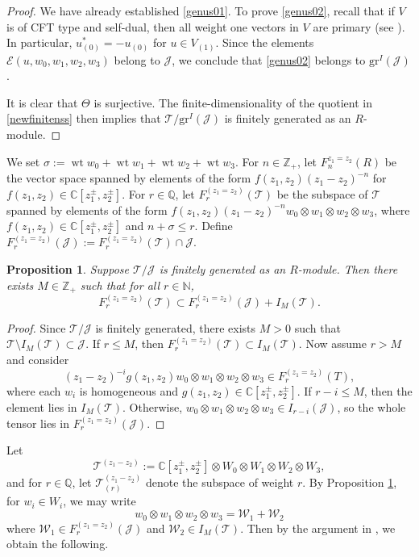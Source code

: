 \documentclass[9pt]{amsart}
\newtheorem{proposition}{Proposition}[section]
\newcommand{\T}{\mathcal{T}}
\newcommand{\J}{\mathcal{J}}
\begin{document}
\begin{proof}
We have already established \eqref{genus01}. To prove \eqref{genus02}, recall that if $V$ is of CFT type and self-dual, then all weight one vectors in $V$ are primary (see \cite{li1994symmetric}). In particular, $u_{(0)}^{*} = -u_{(0)}$ for $u \in V_{(1)}$. Since the elements $\mathcal{E}(u, w_0, w_1, w_2, w_3)$ belong to $\J$, we conclude that \eqref{genus02} belongs to $\mathrm{gr}^{I}(\mathcal{J})$.

It is clear that $\Theta$ is surjective. The finite-dimensionality of the quotient in \eqref{newfinitenss} then implies that $\T / \mathrm{gr}^I(\J)$ is finitely generated as an $R$-module.
\end{proof}

We set $\sigma := \operatorname{wt} w_0 + \operatorname{wt} w_1 + \operatorname{wt} w_2 + \operatorname{wt} w_3$. For $n \in \mathbb{Z}_{+}$, let $F_n^{z_1 = z_2}(R)$ be the vector space spanned by elements of the form $f(z_1, z_2)(z_1 - z_2)^{-n}$ for $f(z_1, z_2) \in \mathbb{C}[z_1^{\pm}, z_2^{\pm}]$. For $r \in \mathbb{Q}$, let $F_r^{(z_1 = z_2)}(\T)$ be the subspace of $\T$ spanned by elements of the form $f(z_1, z_2)(z_1 - z_2)^{-n} w_0 \otimes w_1 \otimes w_2 \otimes w_3$, where $f(z_1, z_2) \in \mathbb{C}[z_1^{\pm}, z_2^{\pm}]$ and $n + \sigma \leq r$. Define $F_r^{(z_1 = z_2)}(\J) := F_r^{(z_1 = z_2)}(\T) \cap \J$.

\begin{proposition}\label{decom}
Suppose $\T/\J$ is finitely generated as an $R$-module. Then there exists $M \in \mathbb{Z}_{+}$ such that for all $r \in \mathbb{N}$,
\[
F_r^{(z_1 = z_2)}(\T) \subset F_r^{(z_1 = z_2)}(\J) + I_M(\T).
\]
\end{proposition}

\begin{proof}
Since $\T/\J$ is finitely generated, there exists $M > 0$ such that $\T \setminus I_M(\T) \subset \J$. If $r \leq M$, then $F_r^{(z_1 = z_2)}(\T) \subset I_M(\T)$. Now assume $r > M$ and consider
\[
(z_1 - z_2)^{-i} g(z_1, z_2) w_0 \otimes w_1 \otimes w_2 \otimes w_3 \in F_r^{(z_1 = z_2)}(T),
\]
where each $w_i$ is homogeneous and $g(z_1, z_2) \in \mathbb{C}[z_1^{\pm}, z_2^{\pm}]$. If $r - i \leq M$, then the element lies in $I_M(\T)$. Otherwise, $w_0 \otimes w_1 \otimes w_2 \otimes w_3 \in I_{r-i}(\J)$, so the whole tensor lies in $F_r^{(z_1 = z_2)}(\J)$.
\end{proof}

Let
\[
\T^{(z_1 - z_2)} := \mathbb{C}[z_1^{\pm}, z_2^{\pm}] \otimes W_0 \otimes W_1 \otimes W_2 \otimes W_3,
\]
and for $r \in \mathbb{Q}$, let $\T_{(r)}^{(z_1 - z_2)}$ denote the subspace of weight $r$. By Proposition \ref{decom}, for $w_i \in W_i$, we may write
\[
w_0 \otimes w_1 \otimes w_2 \otimes w_3 = \mathcal{W}_1 + \mathcal{W}_2
\]
where $\mathcal{W}_1 \in F_r^{(z_1 = z_2)}(\J)$ and $\mathcal{W}_2 \in I_M(\T)$. Then by the argument in \cite[Lemma 2.2]{huang2005differential1}, we obtain the following.
\end{document}
